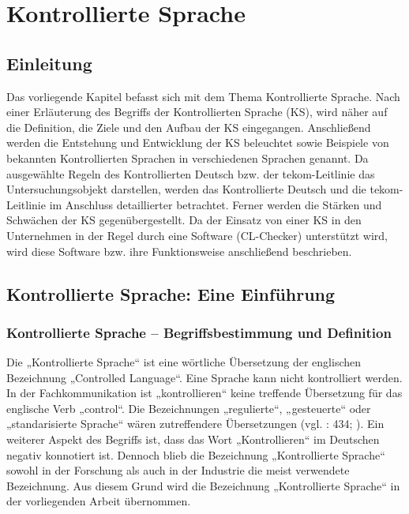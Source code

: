 \chapter{\label{ch:2}Kontrollierte Sprache}


\section{\label{sec:2.0}Einleitung}

Das vorliegende Kapitel befasst sich mit dem Thema Kontrollierte Sprache. Nach einer Erläuterung des Begriffs der Kontrollierten Sprache (KS), wird näher auf die Definition, die Ziele und den Aufbau der KS eingegangen. Anschließend werden die Entstehung und Entwicklung der KS beleuchtet sowie Beispiele von bekannten Kontrollierten Sprachen in verschiedenen Sprachen genannt. Da ausgewählte Regeln des Kontrollierten Deutsch bzw. der tekom-Leitlinie das Untersuchungsobjekt darstellen, werden das Kontrollierte Deutsch und die tekom-Leitlinie im Anschluss detaillierter betrachtet. Ferner werden die Stärken und Schwächen der KS gegenübergestellt. Da der Einsatz von einer KS in den Unternehmen in der Regel durch eine Software (CL-Checker) unterstützt wird, wird diese Software bzw. ihre Funktionsweise anschließend beschrieben.

\section{\label{sec:2.1}Kontrollierte Sprache: Eine Einführung}

\subsection{Kontrollierte Sprache -- Begriffsbestimmung und Definition}
\label{sec:2.1.1}
Die „Kontrollierte Sprache“ ist eine wörtliche Übersetzung der englischen Bezeichnung „Controlled Language“. Eine Sprache kann nicht kontrolliert werden. In der Fachkommunikation ist „kontrollieren“ keine treffende Übersetzung für das englische Verb „control“. Die Bezeichnungen „regulierte“, „gesteuerte“ oder „standarisierte Sprache“ wären zutreffendere Übersetzungen (vgl. \citealt{Schubert1999}: 434; \citealt{Göpferich2007a}). Ein weiterer Aspekt des Begriffs ist, dass das Wort „Kontrollieren“ im Deutschen negativ konnotiert ist. Dennoch blieb die Bezeichnung „Kontrollierte Sprache“ sowohl in der Forschung als auch in der Industrie die meist verwendete Bezeichnung. Aus diesem Grund wird die Bezeichnung „Kontrollierte Sprache“ in der vorliegenden Arbeit übernommen.

